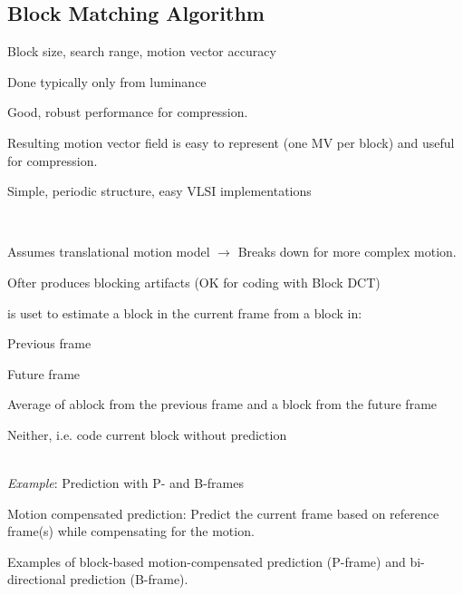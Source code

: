 \begin{compactdesc}
\section{Block Matching Algorithm}
\item[\lp{Issues}] Block size, search range, motion vector accuracy
\item[\lp{Estimate}] Done typically only from luminance
\item[\lp{Advantages}] 
	\begin{enumerate*}[label=\protect\circled{\arabic*},itemjoin=]
		\item Good, robust performance for compression. \\
		\item Resulting motion vector field is easy to represent (one MV per block) and useful for compression. \\
		\item Simple, periodic structure, easy VLSI implementations
	\end{enumerate*}
\item[\lp{Disadvantages}] \hfill\\
	\begin{enumerate*}[label=\protect\circled{\arabic*},itemjoin=]
		\item Assumes translational motion model $\to$ Breaks down for more complex motion.\\
		\item Ofter produces blocking artifacts (OK for coding with Block DCT)
	\end{enumerate*}
\item[\lp{Bidirectional MC prediction}]
	is uset to estimate a block in the current frame from a block in:\\
	\begin{enumerate*}[label=\protect\circled{\arabic*},itemjoin=]
		\item Previous frame\\
		\item Future frame\\
		\item Average of ablock from the previous frame and a block from the future frame\\
		\item Neither, i.e. code current block without prediction
	\end{enumerate*}\\
	\emph{Example}: Prediction with P- and B-frames\\
	\begin{enumerate*}[label=\protect\circled{\arabic*},itemjoin=]
		\item Motion compensated prediction: Predict the current frame based on reference frame(s) while compensating for the motion.\\
		\item Examples of block-based motion-compensated prediction (P-frame) and bi-directional prediction (B-frame).
	\end{enumerate*}

\end{compactdesc}
